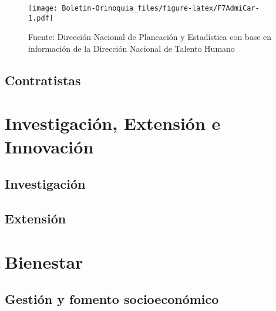 \documentclass[
]{book}
\begin{document}
\begin{figure}
\centering
\texttt{[image: Boletin-Orinoquia\_files/figure-latex/F7AdmiCar-1.pdf]}
\caption{\label{fig:F7AdmiCar}Fuente: Dirección Nacional de Planeación y Estadística con base en información de la Dirección Nacional de Talento Humano}
\end{figure}

\hypertarget{Contrat}{%
\section{Contratistas}\label{Contrat}}

\hypertarget{Inv}{%
\chapter{Investigación, Extensión e Innovación}\label{Inv}}

\hypertarget{investigaciuxf3n}{%
\section{Investigación}\label{investigaciuxf3n}}

\hypertarget{extensiuxf3n}{%
\section{Extensión}\label{extensiuxf3n}}

\hypertarget{Bie}{%
\chapter{Bienestar}\label{Bie}}

\hypertarget{gestiuxf3n-y-fomento-socioeconuxf3mico}{%
\section{Gestión y fomento socioeconómico}\label{gestiuxf3n-y-fomento-socioeconuxf3mico}}

  
\end{document}
